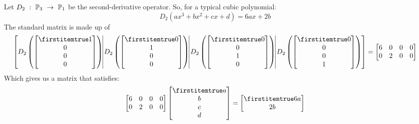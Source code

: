 \documentclass{beamer}
\begin{document}
\begin{frame}
\begin{example}
Let $D_2\ :\ \mathbb{P}_3\ \rightarrow\ \mathbb{P}_1$ be the second-derivative operator. So, for a typical cubic polynomial:
\begin{equation*}
D_2(a x^3 + b x^2 + c x + d)=6ax+2b
\end{equation*}\pause
The standard matrix is made up of
\begin{equation*}
\left[
D_2\left(\bvector{1,0,0,0}\right)\vrule
D_2\left(\bvector{0,1,0,0}\right)\vrule
D_2\left(\bvector{0,0,1,0}\right)\vrule
D_2\left(\bvector{0,0,0,1}\right)
\right]
=
\begin{bmatrix}
6 & 0 & 0 & 0 \\
0 & 2 & 0 & 0 \\
\end{bmatrix}
\end{equation*}\pause
Which gives us a matrix that satisfies:
\begin{equation*}
\begin{bmatrix}
6 & 0 & 0 & 0 \\
0 & 2 & 0 & 0 \\
\end{bmatrix}
\bvector{a,b,c,d}=\bvector{6a,2b}
\end{equation*}
\end{example}
\end{frame}
\end{document}
